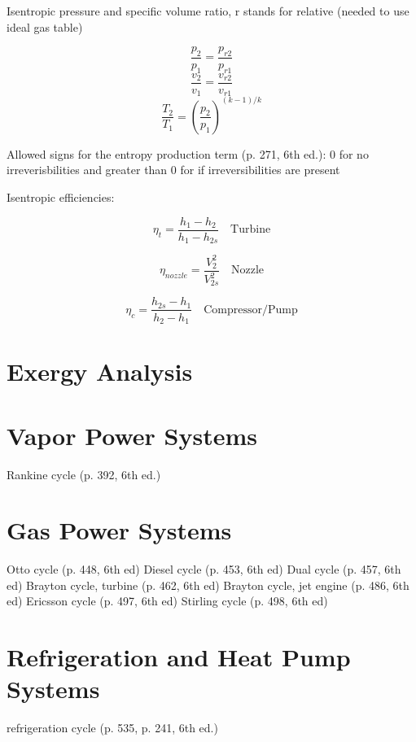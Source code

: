\documentclass[paper=letter, fontsize=11pt]{scrartcl}
\numberwithin{equation}{section}        %
\numberwithin{figure}{section}          %
\numberwithin{table}{section}               %
\begin{document}
Isentropic pressure and specific volume ratio, r stands for relative (needed to use ideal gas table)

\begin{equation}
    \frac{p_2}{p_1}=\frac{p_{r2}}{p_{r1}}
\end{equation}
\begin{equation}
    \frac{v_2}{v_1}=\frac{v_{r2}}{v_{r1}}
\end{equation}
\begin{equation}
    \frac{T_2}{T_1} = \left(\frac{p_2}{p_1}\right)^{(k-1)/k}
\end{equation}

Allowed signs for the entropy production term (p. 271, 6th ed.): 0 for no irreverisbilities and greater than 0 for if irreversibilities are present

Isentropic efficiencies:

\begin{equation}
    \eta_t = \frac{h_1 - h_2}{h_1 - h_{2s}}\quad\text{Turbine}
\end{equation}

\begin{equation}
    \eta_{nozzle} = \frac{V_2^2}{V_{2s}^2}\quad\text{Nozzle}
\end{equation}

\begin{equation}
    \eta_c = \frac{h_{2s} - h_1}{h_2 - h_1}\quad\text{Compressor/Pump}
\end{equation}

\newpage
\section{Exergy Analysis}

\section{Vapor Power Systems}
    Rankine cycle (p. 392, 6th ed.)

\section{Gas Power Systems}
    Otto cycle (p. 448, 6th ed)
    Diesel cycle (p. 453, 6th ed)
    Dual cycle (p. 457, 6th ed)
    Brayton cycle, turbine (p. 462, 6th ed)
    Brayton cycle, jet engine (p. 486, 6th ed)
    Ericsson cycle (p. 497, 6th ed)
    Stirling cycle (p. 498, 6th ed)

\section{Refrigeration and Heat Pump Systems}
    refrigeration cycle (p. 535, p. 241, 6th ed.)
\end{document}
